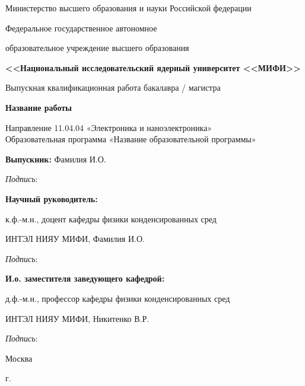 \begin{titlepage}
\begin{center}
\small{Министерство высшего образования и науки Российской федерации}

\small{Федеральное государственное автономное}

\small{образовательное учреждение высшего образования}

\small{\textbf{<<Национальный исследовательский ядерный университет <<МИФИ>>}}

\vspace{20mm}

Выпускная квалификационная работа бакалавра / магистра

\textbf{\large Название работы}

\vspace{10mm}
Направление 11.04.04 «Электроника и наноэлектроника»\\
Образовательная программа
«Название образовательной программы»

\vspace{10mm}

\begin{flushleft}
\textbf{Выпускник:} Фамилия И.О.

\hspace{10cm} \textit{Подпись}: \space \hrulefill

\textbf{Научный руководитель:} 

к.ф.-м.н., доцент кафедры физики конденсированных сред

ИНТЭЛ НИЯУ МИФИ, Фамилия И.О.

\hspace{10cm} \textit{Подпись}: \space \hrulefill

\textbf{И.о. заместителя заведующего кафедрой:} 

д.ф.-м.н., профессор кафедры физики конденсированных сред 

ИНТЭЛ НИЯУ МИФИ, Никитенко В.Р.

\hspace{10cm} \textit{Подпись}: \space \hrulefill \space
\end{flushleft}

\vfill

{Москва}
\par{\the\year{} г.}
\end{center}
\end{titlepage}